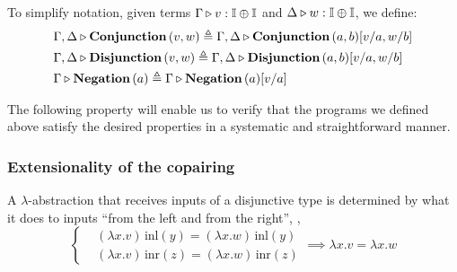 To simplify notation, given terms $\Gamma \triangleright v:\mathbb{I} \oplus \mathbb{I}$ and $\Delta \triangleright  w:\mathbb{I} \oplus \mathbb{I}$, we define:
\begin{equation}
  \begin{split}
    &\Gamma, \Delta  \triangleright \textbf{Conjunction}\,(v,w) \triangleq \Gamma, \Delta  \triangleright \textbf{Conjunction}\,(a,b) [v/a, w/b] \\
    & \Gamma, \Delta  \triangleright \textbf{Disjunction}\,(v,w) \triangleq \Gamma, \Delta  \triangleright \textbf{Disjunction}\,(a,b) [v/a, w/b] \\
     &\Gamma \triangleright \textbf{Negation}\,(a) \triangleq \Gamma \triangleright \textbf{Negation}\,(a) [v/a]
  \end{split}
\end{equation}

 The following property will enable us to verify that the programs we defined above satisfy the desired properties in a systematic and straightforward manner.



\subsubsection{Extensionality of the copairing}

\begin{proposition}
  A $\lambda$-abstraction that receives inputs of a disjunctive type is determined by what it does to inputs ``from the left and from the right'', \ie,
\[
\left\{
\begin{aligned}
&(\lambda x.v)\, \text{inl}(y) = (\lambda x.w)\, \text{inl}(y) \\
&(\lambda x.v)\, \text{inr}(z) =(\lambda x.w)\, \text{inr}(z)
\end{aligned}
\right.
\implies \lambda x.v = \lambda x.w
\]
\end{proposition}


